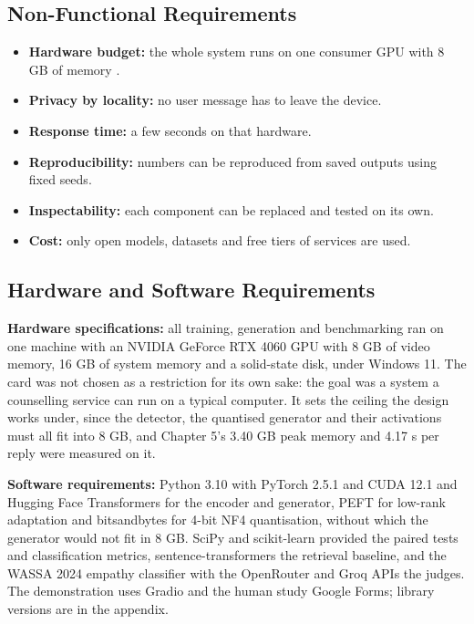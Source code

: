 \subsection{Non-Functional Requirements}

\begin{itemize}
  \item \textbf{Hardware budget:} the whole system runs on one consumer GPU with 8 GB of memory \cite{nvidia_rtx4060}.
  \item \textbf{Privacy by locality:} no user message has to leave the device.
  \item \textbf{Response time: }a few seconds on that hardware.
  \item \textbf{Reproducibility:} numbers can be reproduced from saved outputs using fixed seeds.
  \item \textbf{Inspectability: }each component can be replaced and tested on its own.
  \item \textbf{Cost:} only open models, datasets and free tiers of services are used.
\end{itemize}
\subsection{Hardware and Software Requirements}

\textbf{Hardware specifications:} all training, generation and benchmarking ran on one machine with an NVIDIA GeForce RTX 4060 GPU with 8 GB of video memory, 16 GB of system memory and a solid-state disk, under Windows 11. The card was not chosen as a restriction for its own sake: the goal was a system a counselling service can run on a typical computer. It sets the ceiling the design works under, since the detector, the quantised generator and their activations must all fit into 8 GB, and Chapter 5's 3.40 GB peak memory and 4.17 s per reply were measured on it.

\textbf{Software requirements:} Python 3.10 with PyTorch 2.5.1 and CUDA 12.1 \cite{paszke2019pytorch} and Hugging Face Transformers \cite{wolf2020transformers} for the encoder and generator, PEFT for low-rank adaptation and bitsandbytes for 4-bit NF4 quantisation, without which the generator would not fit in 8 GB. SciPy \cite{virtanen2020scipy} and scikit-learn \cite{pedregosa2011sklearn} provided the paired tests and classification metrics, sentence-transformers \cite{reimers2019sbert} the retrieval baseline, and the WASSA 2024 empathy classifier \cite{giorgi2024wassa} with the OpenRouter and Groq APIs the judges. The demonstration uses Gradio and the human study Google Forms; library versions are in the appendix.

